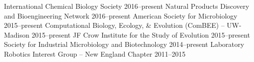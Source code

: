 \newpage


\begin{cvhonors}
  \cvhonor
    {International Chemical Biology Society} %
    {} %
    {2016--present} %
  \cvhonor
    {Natural Products Discovery and Bioengineering Network} %
    {} %
    {2016--present} %
  \cvhonor
    {American Society for Microbiology} %
    {} %
    {2015--present} %
  \cvhonor
    {Computational Biology, Ecology, \& Evolution (ComBEE) -- UW-Madison} %
    {} %
    {2015--present} %
  \cvhonor
    {JF Crow Institute for the Study of Evolution} %
    {} %
    {2015--present} %
  \cvhonor
    {Society for Industrial Microbiology and Biotechnology} %
    {} %
    {2014--present} %
  \cvhonor
    {Laboratory Robotics Interest Group -- New England Chapter} %
    {} %
    {2011--2015} %
\end{cvhonors}